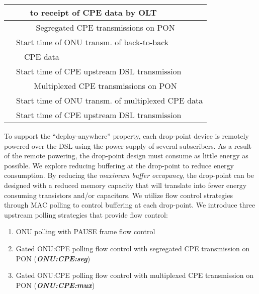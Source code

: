 \documentclass[pdftex,journal]{IEEEtran}
\begin{document}
\begin{table}[t]
\begin{tabular}{|l|l|}
   & \ \ \ to receipt of CPE data by OLT \\ \hline
\multicolumn{2}{|c|}{Segregated CPE transmissions on PON} \\
 & Start time of ONU transm. of
   back-to-back \\
    & \ \ CPE  data \\
 & Start time of CPE  upstream DSL transmission \\ \hline
\multicolumn{2}{|c|}{Multiplexed CPE transmissions on PON} \\
  & Start time of ONU transm. of multiplexed CPE data \\
 & Start time of CPE  upstream DSL transmission \\ \hline
\end{tabular}
\end{table}

To support the ``deploy-anywhere'' property, each drop-point device is
remotely powered over the DSL using the power supply of several
subscribers. As a result of the remote powering, the drop-point design
must consume as little energy as possible. We explore reducing
buffering at the drop-point to reduce energy consumption. By reducing
the \textit{maximum buffer occupancy}, the drop-point can be designed
with a reduced memory capacity that will translate into fewer energy
consuming transistors and/or capacitors.
We utilize flow control
strategies through MAC polling to control buffering at each
drop-point. We introduce three upstream polling strategies that
provide flow control:
\begin{enumerate}
  \item ONU polling with PAUSE frame flow control
  \item Gated ONU:CPE polling flow control
    with segregated CPE transmission on PON (\textit{\textbf{ONU:CPE:seg}})
  \item Gated ONU:CPE polling flow control
    with multiplexed CPE transmission on PON (\textit{\textbf{ONU:CPE:mux}})
\end{enumerate}
\end{document}
